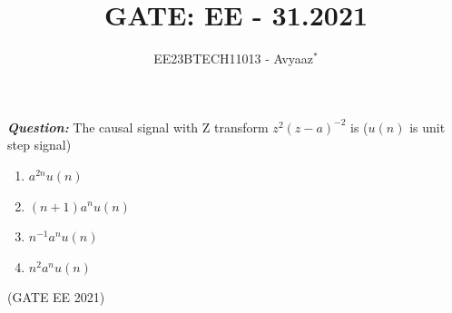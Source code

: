 \documentclass[journal,12pt,twocolumn]{IEEEtran}
\theoremstyle{remark}
\begin{document}

\vspace{3cm}

\title{GATE: EE - 31.2021}
\author{EE23BTECH11013 - Avyaaz$^{*}$%
}
\maketitle
\newpage
\bigskip

\renewcommand{\thefigure}{\arabic{figure}}
\renewcommand{\thetable}{\arabic{table}}

\large\textbf{\textsl{Question:}}
The causal signal with Z transform $z^2(z - a)^{-2}$ is ($u(n)$ is unit step signal)
\begin{enumerate}
    \item $a^{2n}u(n)$
    \item $(n + 1)a^nu(n)$
    \item $n^{-1}a^nu(n)$
    \item $n^2a^nu(n)$
\end{enumerate}

\hfill(GATE EE 2021) \\
\solution

%      

\end{document}
